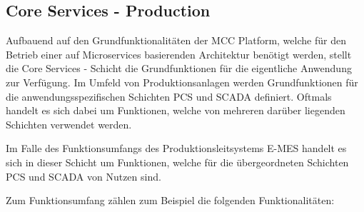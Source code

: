
\subsection{Core Services - Production\label{subsec3.1.2:Unterunterpunkt-2}}

Aufbauend auf den Grundfunktionalitäten der \glqq MCC Platform\grqq{}, welche für den Betrieb einer auf Microservices basierenden Architektur benötigt werden, stellt die \glqq Core Services\grqq{} - Schicht die Grundfunktionen für die eigentliche Anwendung zur Verfügung. Im Umfeld von Produktionsanlagen werden Grundfunktionen für die anwendungsspezifischen Schichten \glqq PCS\grqq{} und \glqq SCADA\grqq{} definiert. Oftmals handelt es sich dabei um Funktionen, welche von mehreren darüber liegenden Schichten verwendet werden.

Im Falle des Funktionsumfangs des Produktionsleitsystems \glqq E-MES\grqq{} handelt es sich in dieser Schicht um Funktionen, welche für die übergeordneten Schichten \glqq PCS\grqq{} und \glqq SCADA\grqq{} von Nutzen sind.

Zum Funktionsumfang zählen zum Beispiel die folgenden Funktionalitäten:

